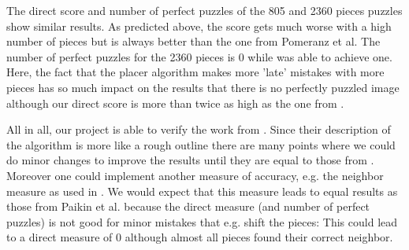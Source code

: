 \documentclass[11pt]{report}
\begin{document}
The direct score and number of perfect puzzles of the 805 and 2360 pieces puzzles show similar results. As predicted above, the score gets much worse with a high number of pieces but is always better than the one from Pomeranz et al. The number of perfect puzzles for the 2360 pieces is 0 while \cite{Pomeranz2011} was able to achieve one. Here, the fact that the placer algorithm makes more 'late' mistakes with more pieces has so much impact on the results that there is no perfectly puzzled image although our direct score is more than twice as high as the one from \cite{Pomeranz2011}.

All in all, our project is able to verify the work from \cite{Paikin2015}. Since their description of the algorithm is more like a rough outline there are many points where we could do minor changes to improve the results until they are equal to those from \cite{Paikin2015}. Moreover one could implement another measure of accuracy, e.g. the neighbor measure as used in \cite{Paikin2015}. We would expect that this measure leads to equal results as those from Paikin et al. because the direct measure (and number of perfect puzzles) is not good for minor mistakes that e.g. shift the pieces: This could lead to a direct measure of 0 although almost all pieces found their correct neighbor. 


\nocite{*}


\end{document}
